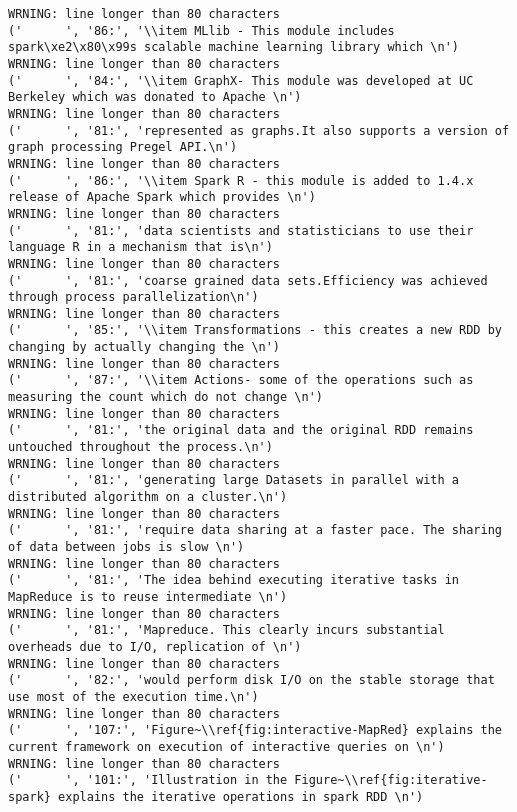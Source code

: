 \begin{tiny}
\begin{verbatim}
WRNING: line longer than 80 characters
('      ', '86:', '\\item MLlib - This module includes spark\xe2\x80\x99s scalable machine learning library which \n')
WRNING: line longer than 80 characters
('      ', '84:', '\\item GraphX- This module was developed at UC Berkeley which was donated to Apache \n')
WRNING: line longer than 80 characters
('      ', '81:', 'represented as graphs.It also supports a version of graph processing Pregel API.\n')
WRNING: line longer than 80 characters
('      ', '86:', '\\item Spark R - this module is added to 1.4.x release of Apache Spark which provides \n')
WRNING: line longer than 80 characters
('      ', '81:', 'data scientists and statisticians to use their language R in a mechanism that is\n')
WRNING: line longer than 80 characters
('      ', '81:', 'coarse grained data sets.Efficiency was achieved through process parallelization\n')
WRNING: line longer than 80 characters
('      ', '85:', '\\item Transformations - this creates a new RDD by changing by actually changing the \n')
WRNING: line longer than 80 characters
('      ', '87:', '\\item Actions- some of the operations such as measuring the count which do not change \n')
WRNING: line longer than 80 characters
('      ', '81:', 'the original data and the original RDD remains untouched throughout the process.\n')
WRNING: line longer than 80 characters
('      ', '81:', 'generating large Datasets in parallel with a distributed algorithm on a cluster.\n')
WRNING: line longer than 80 characters
('      ', '81:', 'require data sharing at a faster pace. The sharing of data between jobs is slow \n')
WRNING: line longer than 80 characters
('      ', '81:', 'The idea behind executing iterative tasks in MapReduce is to reuse intermediate \n')
WRNING: line longer than 80 characters
('      ', '81:', 'Mapreduce. This clearly incurs substantial overheads due to I/O, replication of \n')
WRNING: line longer than 80 characters
('      ', '82:', 'would perform disk I/O on the stable storage that use most of the execution time.\n')
WRNING: line longer than 80 characters
('      ', '107:', 'Figure~\\ref{fig:interactive-MapRed} explains the current framework on execution of interactive queries on \n')
WRNING: line longer than 80 characters
('      ', '101:', 'Illustration in the Figure~\\ref{fig:iterative-spark} explains the iterative operations in spark RDD \n')

\end{verbatim}
\end{tiny}
